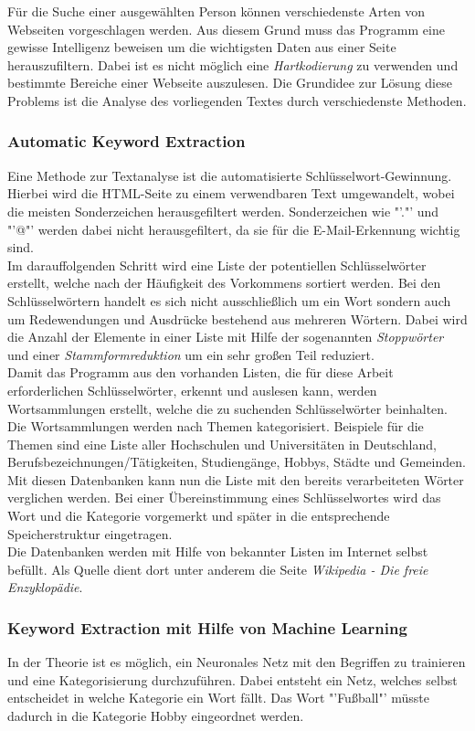 	Für die Suche einer ausgewählten Person können verschiedenste Arten von Webseiten vorgeschlagen werden. Aus diesem Grund muss das Programm eine gewisse Intelligenz beweisen um die wichtigsten Daten aus einer Seite herauszufiltern. Dabei ist es nicht möglich eine \textit{Hartkodierung} zu verwenden und bestimmte Bereiche einer Webseite auszulesen. Die Grundidee zur Lösung diese Problems ist die Analyse des vorliegenden Textes durch verschiedenste Methoden.
		\subsubsection{Automatic Keyword Extraction}
		Eine Methode zur Textanalyse ist die automatisierte Schlüsselwort-Gewinnung. Hierbei wird die HTML-Seite zu einem verwendbaren Text umgewandelt, wobei die meisten Sonderzeichen herausgefiltert werden. Sonderzeichen wie "'."' und "'@"' werden dabei nicht herausgefiltert, da sie für die E-Mail-Erkennung wichtig sind.\\
		Im darauffolgenden Schritt wird eine Liste der potentiellen Schlüsselwörter erstellt, welche nach der Häufigkeit des Vorkommens sortiert werden. Bei den Schlüsselwörtern handelt es sich nicht ausschließlich um ein Wort sondern auch um Redewendungen und Ausdrücke bestehend aus mehreren Wörtern. Dabei wird die Anzahl der Elemente in einer Liste mit Hilfe der sogenannten \textit{Stoppwörter} und einer \textit{Stammformreduktion} um ein sehr großen Teil reduziert.\\
		Damit das Programm aus den vorhanden Listen, die für diese Arbeit erforderlichen Schlüsselwörter, erkennt und auslesen kann, werden Wortsammlungen erstellt, welche die zu suchenden Schlüsselwörter beinhalten. Die Wortsammlungen werden nach Themen kategorisiert. Beispiele für die Themen sind eine Liste aller Hochschulen und Universitäten in Deutschland, Berufsbezeichnungen/Tätigkeiten, Studiengänge, Hobbys, Städte und Gemeinden. Mit diesen Datenbanken kann nun die Liste mit den bereits verarbeiteten Wörter verglichen werden. Bei einer Übereinstimmung eines Schlüsselwortes wird das Wort und die Kategorie vorgemerkt und später in die entsprechende Speicherstruktur eingetragen. \\
		Die Datenbanken werden mit Hilfe von bekannter Listen im Internet selbst befüllt. Als Quelle dient dort unter anderem die Seite \textit{Wikipedia - Die freie Enzyklopädie}. 
		\subsubsection{Keyword Extraction mit Hilfe von Machine Learning}
		In der Theorie ist es möglich, ein Neuronales Netz mit den Begriffen zu trainieren und eine Kategorisierung durchzuführen. Dabei entsteht ein Netz, welches selbst entscheidet in welche Kategorie ein Wort fällt. Das Wort "'Fußball"' müsste dadurch in die Kategorie Hobby eingeordnet werden.
